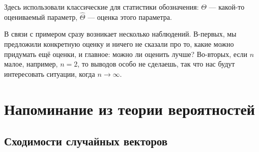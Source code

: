 \begin{note}
    Здесь использовали классические для статистики обозначения: $\Theta$ --- какой-то оцениваемый параметр, $\hat{\Theta}$ --- оценка этого параметра.
\end{note}

\begin{note}
    В связи с примером сразу возникает несколько наблюдений. В-первых, мы предложили конкретную оценку и ничего не сказали про то, какие можно придумать ещё оценки, и главное: можно ли оценить лучше? Во-вторых, если $n$ малое, например, $n = 2$, то выводов особо не сделаешь, так что нас будут интересовать ситуации, когда $n \to \infty$.   
\end{note}

\section{Напоминание из теории вероятностей}

\subsection{Сходимости случайных векторов}

